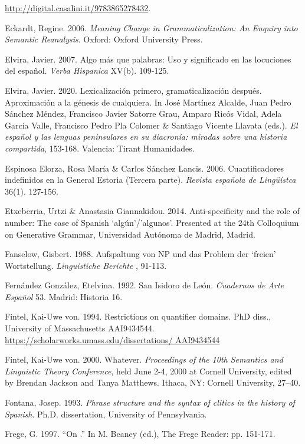 \documentclass[output=paper]{langscibook}
\begin{document}
  \url{http://digital.casalini.it/9783865278432}.

Eckardt, Regine. 2006. \textit{Meaning Change in Grammaticalization: An Enquiry into Semantic Reanalysis}. Oxford: Oxford University Press.

Elvira, Javier. 2007. Algo más que palabras: Uso y significado en las locuciones del español. \textit{Verba Hispanica} XV(b). 109-125.

Elvira, Javier. 2020. Lexicalización primero, gramaticalización después. Aproximación a la génesis de cualquiera. In José Martínez Alcalde, Juan Pedro Sánchez Méndez, Francisco Javier Satorre Grau, Amparo Ricós Vidal, Adela García Valle, Francisco Pedro Pla Colomer \& Santiago Vicente Llavata (eds.). \textit{El español y las lenguas peninsulares en su diacronía: miradas sobre una historia compartida}, 153-168. Valencia: Tirant Humanidades. 

Espinosa Elorza, Rosa María \& Carlos Sánchez Lancis. 2006. Cuantificadores indefinidos en la General Estoria (Tercera parte). \textit{Revista española de Lingüístca} 36(1). 127-156.

Etxeberria, Urtzi \& Anastasia Giannakidou. 2014. Anti-specificity and the role of number: The case of Spanish ‘algún’/’algunos’. Presented at the 24th Colloquium on Generative Grammar, Universidad Autónoma de Madrid, Madrid.

Fanselow, Gisbert. 1988. Aufspaltung von NP und das Problem der ‘freien’ Wortstellung. \textit{Linguistiche Berichte} , 91-113.

Fernández González, Etelvina. 1992. San Isidoro de León. \textit{Cuadernos de Arte Español} 53. Madrid: Historia 16.

Fintel, Kai-Uwe von. 1994. Restrictions on quantifier domains. PhD diss., University of Massachusetts AAI9434544. \href{https://scholarworks.umass.edu/dissertations/%20AAI9434544}{{https://scholarworks.umass.edu/dissertations/ AAI9434544}}

Fintel, Kai-Uwe von. 2000. Whatever. \textit{Proceedings of the 10th Semantics and Linguistic Theory Conference}, held June 2-4, 2000 at Cornell University, edited by Brendan Jackson and Tanya Matthews. Ithaca, NY: Cornell University, 27–40.

Fontana, Josep. 1993. \textit{Phrase structure and the syntax of clitics in the history of Spanish}. Ph.D. dissertation, University of Pennsylvania.

Frege, G. 1997. “On \citet{SinnBedeutung1892}.” In M. Beaney (ed.), The Frege Reader: pp. 151-171.
\end{document}
